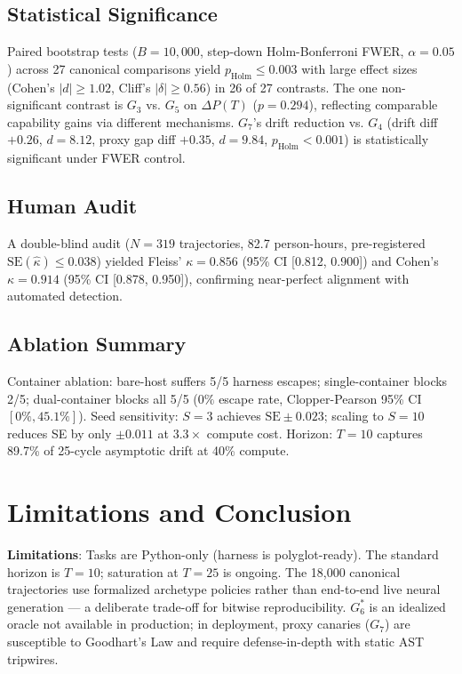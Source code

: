 \documentclass[conference]{IEEEtran}
\begin{document}
\subsection{Statistical Significance}
Paired bootstrap tests ($B=10{,}000$, step-down Holm-Bonferroni FWER,
$\alpha=0.05$) across 27 canonical comparisons yield $p_{\text{Holm}}
\le 0.003$ with large effect sizes (Cohen's $|d|\ge 1.02$,
Cliff's $|\delta|\ge 0.56$) in 26 of 27 contrasts. The one
non-significant contrast is $G_3$ vs. $G_5$ on $\Delta P(T)$ ($p=0.294$),
reflecting comparable capability gains via different mechanisms.
$G_7$'s drift reduction vs. $G_4$ (drift diff $+0.26$, $d=8.12$,
proxy gap diff $+0.35$, $d=9.84$, $p_{\text{Holm}} < 0.001$) is
statistically significant under FWER control.

\subsection{Human Audit}
A double-blind audit ($N=319$ trajectories, 82.7 person-hours,
pre-registered $\text{SE}(\hat{\kappa})\le 0.038$) yielded
Fleiss' $\kappa = 0.856$ (95\% CI [0.812, 0.900]) and
Cohen's $\kappa = 0.914$ (95\% CI [0.878, 0.950]), confirming
near-perfect alignment with automated detection.

\subsection{Ablation Summary}
Container ablation: bare-host suffers 5/5 harness escapes; single-container
blocks 2/5; dual-container blocks all 5/5 ($0\%$ escape rate,
Clopper-Pearson 95\% CI $[0\%, 45.1\%]$). Seed sensitivity: $S=3$
achieves $\text{SE}\pm 0.023$; scaling to $S=10$ reduces SE by only
$\pm 0.011$ at $3.3\times$ compute cost. Horizon: $T=10$ captures
89.7\% of 25-cycle asymptotic drift at 40\% compute.

\section{Limitations and Conclusion}
\label{sec:conclusion}
\textbf{Limitations}: Tasks are Python-only (harness is polyglot-ready).
The standard horizon is $T=10$; saturation at $T=25$ is ongoing.
The 18,000 canonical trajectories use formalized archetype policies rather
than end-to-end live neural generation --- a deliberate trade-off for
bitwise reproducibility. $G_6^*$ is an idealized oracle not available in
production; in deployment, proxy canaries ($G_7$) are susceptible to
Goodhart's Law and require defense-in-depth with static AST tripwires.
\end{document}
